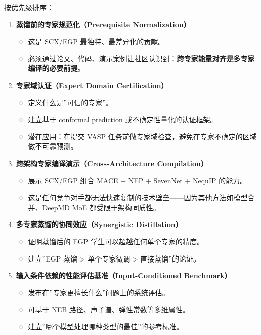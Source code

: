 \documentclass[
  12pt,
]{ctexart}
\providecommand{\tightlist}{%
  \setlength{\itemsep}{0pt}\setlength{\parskip}{0pt}}
\begin{document}
按优先级排序：

\begin{enumerate}
\def\labelenumi{\arabic{enumi}.}
\tightlist
\item
  \textbf{蒸馏前的专家规范化（Prerequisite Normalization）}

  \begin{itemize}
  \tightlist
  \item
    这是 SCX/EGP 最独特、最差异化的贡献。
  \item
    必须通过论文、代码、演示案例让社区认识到：\textbf{跨专家能量对齐是多专家编译的必要前提}。
  \end{itemize}
\item
  \textbf{专家域认证（Expert Domain Certification）}

  \begin{itemize}
  \tightlist
  \item
    定义什么是''可信的专家''。
  \item
    建立基于 conformal prediction 或不确定性量化的认证框架。
  \item
    潜在应用：在提交 VASP
    任务前做专家域检查，避免在专家不确定的区域做不可靠预测。
  \end{itemize}
\item
  \textbf{跨架构专家编译演示（Cross-Architecture Compilation）}

  \begin{itemize}
  \tightlist
  \item
    展示 SCX/EGP 组合 MACE + NEP + SevenNet + NequIP 的能力。
  \item
    这是任何竞争对手都无法快速复制的技术壁垒------因为其他方法如模型合并、DeepMD
    MoE 都受限于架构同质性。
  \end{itemize}
\item
  \textbf{多专家蒸馏的协同效应（Synergistic Distillation）}

  \begin{itemize}
  \tightlist
  \item
    证明蒸馏后的 EGP 学生可以超越任何单个专家的精度。
  \item
    建立''EGP 蒸馏 \textgreater{} 单个专家微调 \textgreater{}
    直接蒸馏''的论证。
  \end{itemize}
\item
  \textbf{输入条件依赖的性能评估基准（Input-Conditioned Benchmark）}

  \begin{itemize}
  \tightlist
  \item
    发布在''专家更擅长什么''问题上的系统评估。
  \item
    可基于 NEB 路径、声子谱、弹性常数等多维属性。
  \item
    建立''哪个模型处理哪种类型的最佳''的参考标准。
  \end{itemize}
\end{enumerate}
\end{document}
